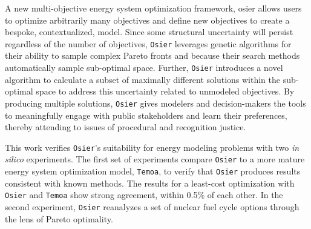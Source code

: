 A new multi-objective energy system optimization framework, \gls{osier} allows
users to optimize arbitrarily many objectives and define new objectives to
create a bespoke, contextualized, model. Since some structural uncertainty will
persist regardless of the number of objectives, \texttt{Osier} leverages genetic
algorithms for their ability to sample complex Pareto fronts and because their
search methods automatically sample sub-optimal space. Further, \texttt{Osier}
introduces a novel algorithm to calculate a subset of maximally different
solutions within the sub-optimal space to address this uncertainty related to
unmodeled objectives. By producing multiple solutions, \texttt{Osier} gives
modelers and decision-makers the tools to meaningfully engage with public
stakeholders and learn their preferences, thereby attending to issues of
procedural and recognition justice.

This work verifies \texttt{Osier}'s suitability for energy modeling problems
with two \textit{in silico} experiments. The first set of experiments compare
\texttt{Osier} to a more mature energy system optimization model,
\texttt{Temoa}, to verify that \texttt{Osier} produces results consistent with
known methods. The results for a least-cost optimization with \texttt{Osier} and
\texttt{Temoa} show strong agreement, within 0.5\% of each other. In the second
experiment, \texttt{Osier} reanalyzes a set of nuclear fuel cycle options through the
lens of Pareto optimality.
